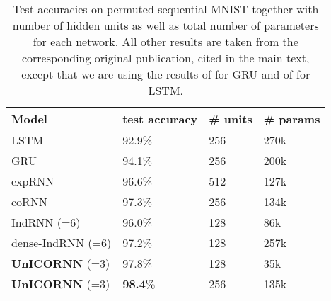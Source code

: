 \documentclass[a4paper]{article}
\begin{document}
\begin{table}[h!]
  \caption{Test accuracies on permuted sequential MNIST together with number of hidden units as well as total number of parameters for each network. All other results are taken from the corresponding original publication, cited in the main text, except that we are using the results of \cite{GRU_results} for GRU and of \cite{scornn} for LSTM.}
  \label{tab:psmnist}
  \centering
  \begin{tabular}{llll}
    \toprule
    \cmidrule(r){1-4}
    { Model} &  test accuracy & \# units & { \# params} \\
    \midrule
LSTM & 92.9\% & 256 & 270k\\
GRU & 94.1\% & 256 & 200k\\
expRNN & 96.6\%  & 512 & 127k\\
coRNN  & 97.3\% & 256 & 134k \\
IndRNN (=6)  & 96.0\% & 128 & 86k\\
dense-IndRNN (=6) & 97.2\% & 128 & 257k \\
\textbf{UnICORNN} (=3) & 97.8\% & 128 & 35k\\
\textbf{UnICORNN} (=3) & \textbf{98.4}\% & 256 & 135k\\
    \bottomrule
  \end{tabular}
\end{table}
\end{document}

